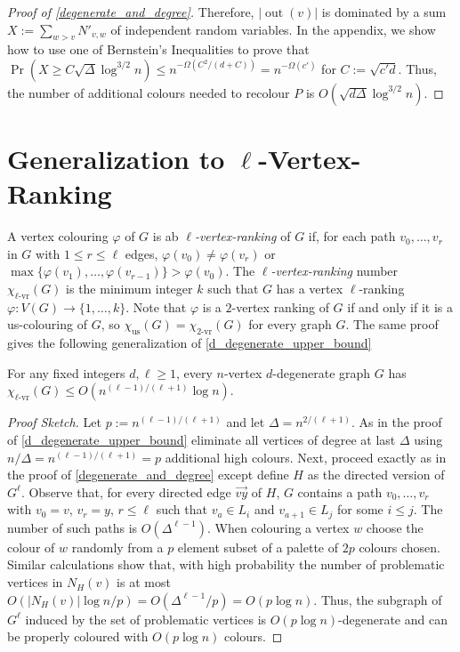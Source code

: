 \documentclass{patmorin}
\newcommand{\defin}[1]{\emph{\color{brightmaroon}#1}}
\DeclareMathOperator{\outn}{out}
\newcommand{\rn}[1]{\chi_{\operatorname{#1-vr}}}
\newcommand{\trn}{\chi_{\mathrm{us}}}
\newcommand{\lrn}{\rn{\ell}}
\begin{document}
\begin{proof}[Proof of \cref{degenerate_and_degree}]
  Therefore, $|\outn(v)|$ is dominated by a sum $X:=\sum_{w> v} N'_{v,w}$ of independent random variables.  In the appendix, we show how to use one of Bernstein's Inequalities to prove that $\Pr\left(X\ge C\sqrt{\Delta}\log^
  {3/2} n\right)\le n^{-\Omega(C^2/(d+C))} = n^{-\Omega(c')}$ for $C:=\sqrt{c'd}$.  Thus, the number of additional colours needed to recolour $P$ is $O(\sqrt{d\Delta}\log^{3/2} n)$.
\end{proof}

\section{Generalization to $\ell$-Vertex-Ranking}

A vertex colouring $\varphi$ of $G$ is ab \defin{$\ell$-vertex-ranking} of $G$ if, for each path $v_0,\ldots,v_r$ in $G$ with $1\le r\le\ell$ edges, $\varphi(v_0)\neq \varphi(v_r)$ or $\max\{\varphi(v_1),\ldots,\varphi(v_{r-1})\}>\varphi(v_0)$.  The \defin{$\ell$-vertex-ranking} number $\lrn(G)$ is the minimum integer $k$ such that $G$ has a vertex $\ell$-ranking $\varphi:V(G)\to\{1,\ldots,k\}$.  Note that $\varphi$ is a $2$-vertex ranking of $G$ if and only if it is a us-colouring of $G$, so $\trn(G)=\rn{2}(G)$ for every graph $G$.  The same proof gives the following generalization of \cref{d_degenerate_upper_bound}

\begin{thm}
  For any fixed integers $d,\ell\ge 1$, every $n$-vertex $d$-degenerate graph $G$ has $\lrn(G) \le O(n^{(\ell-1)/(\ell+1)}\log  n)$.
\end{thm}

\begin{proof}[Proof Sketch]
  Let $p:=n^{(\ell-1)/(\ell+1)}$ and let $\Delta=n^{2/(\ell+1)}$.  As in the proof of \cref{d_degenerate_upper_bound} eliminate all vertices of degree at last $\Delta$ using $n/\Delta = n^{(\ell-1)/(\ell+1)}=p$ additional high colours.  Next, proceed exactly as in the proof of \cref{degenerate_and_degree} except define $H$ as the directed version of $G^{\ell}$.  Observe that, for every directed edge $\overrightarrow{vy}$ of $H$, $G$ contains a path $v_0,\ldots,v_r$ with $v_0=v$, $v_r=y$, $r\le \ell$ such that $v_a\in L_i$ and $v_{a+1}\in L_j$ for some $i\le j$.  The number of such paths is $O(\Delta^{\ell-1})$. When colouring a vertex $w$ choose the colour of $w$ randomly from a $p$ element subset of a palette of $2p$ colours chosen.  Similar calculations show that, with high probability the number of problematic vertices in $N_H(v)$ is at most $O(|N_H(v)|\log n/p)=O(\Delta^{\ell-1}/p)=O(p\log n)$.  Thus, the subgraph of $G^\ell$ induced by the set of problematic vertices is $O(p\log n)$-degenerate and can be properly coloured with $O(p\log n)$ colours.
\end{proof}
\end{document}
